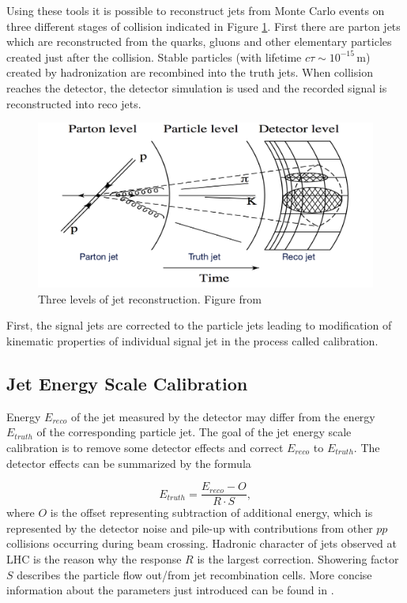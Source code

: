 Using these tools it is possible to reconstruct jets from Monte Carlo events on three
different stages of collision indicated in Figure \ref{fig:JetPhases}. First
there are parton jets which are reconstructed from the quarks, gluons and other
elementary particles created just after the collision. Stable particles (with
lifetime $c\tau \sim 10^{-15}\,\text{m}$) created by hadronization are recombined into
the truth jets. When collision reaches the detector, the detector simulation
is used and the recorded signal is reconstructed into reco jets.

\begin{figure}[t]
  \centering
  \includegraphics[width=\textwidth]{Chapter2/JetPhases.png}
  \caption{Three levels of jet reconstruction. Figure from \cite{ZdenekThesis} }
  \label{fig:JetPhases}
\end{figure}

First, the signal jets are corrected to the particle jets leading to modification
of kinematic properties of individual signal jet in the process called 
calibration. 

\subsection{Jet Energy Scale Calibration}

Energy $E_{reco}$ of the jet measured by the detector may differ from the energy
$E_{truth}$ of the corresponding particle jet. The goal of the jet energy scale
calibration is to remove some detector effects and correct $E_{reco}$ to
$E_{truth}$. The detector effects can be summarized by the formula

\begin{equation}
  E_{truth} = \frac{E_{reco} - O}{R \cdot S},
\end{equation}
where $O$ is the offset representing subtraction of additional energy,
which is represented by the detector noise and pile-up with contributions from
other $pp$ collisions occurring during beam crossing. Hadronic character of
jets observed at LHC is the reason why the response $R$ is the largest
correction. Showering factor $S$ describes the particle flow out/from jet
recombination cells. More concise information about the parameters just
introduced can be found in \cite{ZdenekThesis}.

